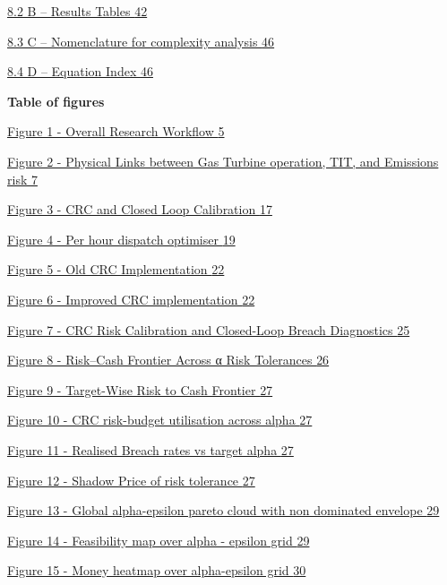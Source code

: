 \documentclass[11pt]{article}
\begin{document}
\hyperref[b-results-tables]{8.2 B -- Results Tables
\hyperref[b-results-tables]{42}}

\hyperref[c-nomenclature-for-complexity-analysis]{8.3 C -- Nomenclature
for complexity analysis
\hyperref[c-nomenclature-for-complexity-analysis]{46}}

\hyperref[d-equation-index]{8.4 D -- Equation Index
\hyperref[d-equation-index]{46}}

\textbf{Table of figures}

\hyperref[_Toc228132494]{Figure 1 - Overall Research Workflow
\hyperref[_Toc228132494]{5}}

\hyperref[_Toc228132495]{Figure 2 - Physical Links between Gas Turbine
operation, TIT, and Emissions risk \hyperref[_Toc228132495]{7}}

\hyperref[_Toc228132496]{Figure 3 - CRC and Closed Loop Calibration
\hyperref[_Toc228132496]{17}}

\hyperref[_Toc228132497]{Figure 4 - Per hour dispatch optimiser
\hyperref[_Toc228132497]{19}}

\hyperref[_Toc228132498]{Figure 5 - Old CRC Implementation
\hyperref[_Toc228132498]{22}}

\hyperref[_Toc228132499]{Figure 6 - Improved CRC implementation
\hyperref[_Toc228132499]{22}}

\hyperref[_Toc228132500]{Figure 7 - CRC Risk Calibration and Closed-Loop
Breach Diagnostics \hyperref[_Toc228132500]{25}}

\hyperref[_Toc228132501]{Figure 8 - Risk--Cash Frontier Across α Risk
Tolerances \hyperref[_Toc228132501]{26}}

\hyperref[_Toc228132502]{Figure 9 - Target-Wise Risk to Cash Frontier
\hyperref[_Toc228132502]{27}}

\hyperref[_Toc228132503]{Figure 10 - CRC risk-budget utilisation across
alpha \hyperref[_Toc228132503]{27}}

\hyperref[_Toc228132504]{Figure 11 - Realised Breach rates vs target
alpha \hyperref[_Toc228132504]{27}}

\hyperref[_Toc228132505]{Figure 12 - Shadow Price of risk tolerance
\hyperref[_Toc228132505]{27}}

\hyperref[_Toc228132506]{Figure 13 - Global alpha-epsilon pareto cloud
with non dominated envelope \hyperref[_Toc228132506]{29}}

\hyperref[_Toc228132507]{Figure 14 - Feasibility map over alpha -
epsilon grid \hyperref[_Toc228132507]{29}}

\hyperref[_Toc228132508]{Figure 15 - Money heatmap over alpha-epsilon
grid \hyperref[_Toc228132508]{30}}
\end{document}
